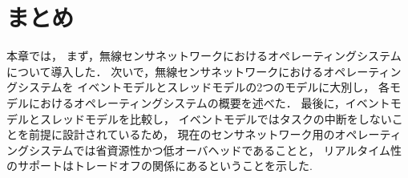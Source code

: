 \section{まとめ}


本章では，
まず，無線センサネットワークにおけるオペレーティングシステムについて導入した．
次いで，無線センサネットワークにおけるオペレーティングシステムを
イベントモデルとスレッドモデルの2つのモデルに大別し，
各モデルにおけるオペレーティングシステムの概要を述べた．
最後に，イベントモデルとスレッドモデルを比較し，
イベントモデルではタスクの中断をしないことを前提に設計されているため，
現在のセンサネットワーク用のオペレーティングシステムでは省資源性かつ低オーバヘッドであることと，
リアルタイム性のサポートはトレードオフの関係にあるということを示した.




